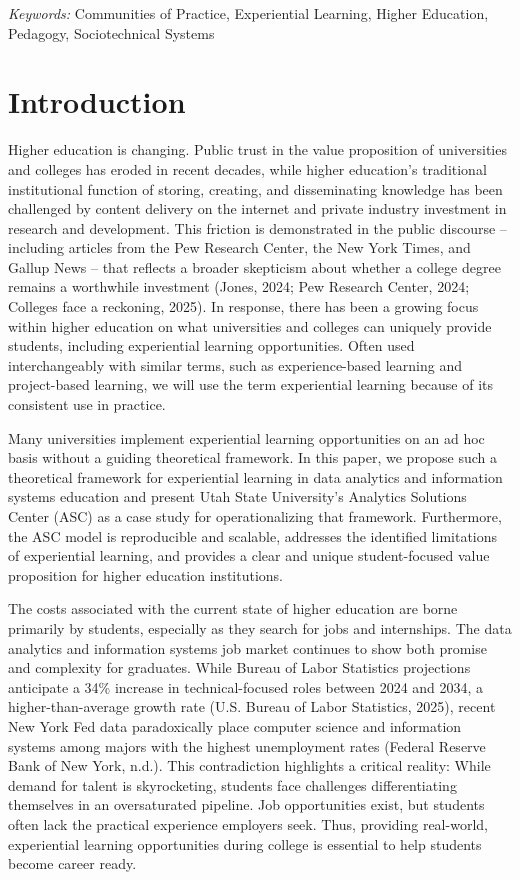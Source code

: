 \documentclass[
  12pt]{article}
\begin{document}
\noindent%
{\it Keywords:} Communities of Practice, Experiential Learning, Higher
Education, Pedagogy, Sociotechnical Systems
\vfill

\newpage
{} %


\section{Introduction}\label{sec-intro}

Higher education is changing. Public trust in the value proposition of
universities and colleges has eroded in recent decades, while higher
education's traditional institutional function of storing, creating, and
disseminating knowledge has been challenged by content delivery on the
internet and private industry investment in research and development.
This friction is demonstrated in the public discourse -- including
articles from the Pew Research Center, the New York Times, and Gallup
News -- that reflects a broader skepticism about whether a college
degree remains a worthwhile investment (Jones, 2024; Pew Research
Center, 2024; Colleges face a reckoning, 2025). In response, there has
been a growing focus within higher education on what universities and
colleges can uniquely provide students, including experiential learning
opportunities. Often used interchangeably with similar terms, such as
experience-based learning and project-based learning, we will use the
term experiential learning because of its consistent use in practice.

Many universities implement experiential learning opportunities on an ad
hoc basis without a guiding theoretical framework. In this paper, we
propose such a theoretical framework for experiential learning in data
analytics and information systems education and present Utah State
University's Analytics Solutions Center (ASC) as a case study for
operationalizing that framework. Furthermore, the ASC model is
reproducible and scalable, addresses the identified limitations of
experiential learning, and provides a clear and unique student-focused
value proposition for higher education institutions.

The costs associated with the current state of higher education are
borne primarily by students, especially as they search for jobs and
internships. The data analytics and information systems job market
continues to show both promise and complexity for graduates. While
Bureau of Labor Statistics projections anticipate a 34\% increase in
technical-focused roles between 2024 and 2034, a higher-than-average
growth rate (U.S. Bureau of Labor Statistics, 2025), recent New York Fed
data paradoxically place computer science and information systems among
majors with the highest unemployment rates (Federal Reserve Bank of New
York, n.d.). This contradiction highlights a critical reality: While
demand for talent is skyrocketing, students face challenges
differentiating themselves in an oversaturated pipeline. Job
opportunities exist, but students often lack the practical experience
employers seek. Thus, providing real-world, experiential learning
opportunities during college is essential to help students become career
ready.
\end{document}
